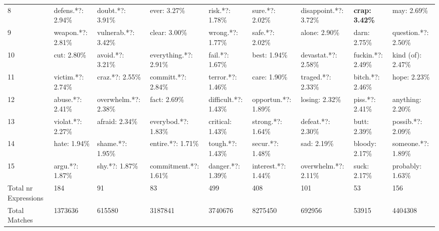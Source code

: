\begin{table}[h]
\begin{adjustbox}{width=\linewidth, center}
\begin{tabular}{lllllllll}
	8                    &           defens.*?: 2.94\% &      doubt.*?: 3.91\% &           ever: 3.27\% &       risk.*?: 1.78\% &      sure.*?: 2.02\% &  disappoint.*?: 3.72\% &      \textbf{crap: 3.42\%} &           may: 2.69\% \\
	9                    &           weapon.*?: 2.81\% &   vulnerab.*?: 3.42\% &          clear: 3.00\% &      wrong.*?: 1.77\% &      safe.*?: 2.02\% &          alone: 2.90\% &               darn: 2.75\% &   question.*?: 2.50\% \\
	10                   &                 cut: 2.80\% &      avoid.*?: 3.21\% &  everything.*?: 2.91\% &       fail.*?: 1.67\% &         best: 1.94\% &    devastat.*?: 2.58\% &          fuckin.*?: 2.49\% &     kind (of): 2.47\% \\
	11                   &           victim.*?: 2.74\% &       craz.*?: 2.55\% &     committ.*?: 2.84\% &     terror.*?: 1.46\% &         care: 1.90\% &      traged.*?: 2.33\% &           bitch.*?: 2.46\% &          hope: 2.23\% \\
	12                   &            abuse.*?: 2.41\% &  overwhelm.*?: 2.38\% &           fact: 2.69\% &  difficult.*?: 1.43\% &  opportun.*?: 1.89\% &         losing: 2.32\% &            piss.*?: 2.41\% &      anything: 2.20\% \\
	13                   &           violat.*?: 2.27\% &        afraid: 2.34\% &    everybod.*?: 1.83\% &      critical: 1.43\% &    strong.*?: 1.64\% &      defeat.*?: 2.30\% &               butt: 2.39\% &     possib.*?: 2.09\% \\
	14                   &                hate: 1.94\% &      shame.*?: 1.95\% &      entire.*?: 1.71\% &      tough.*?: 1.43\% &     secur.*?: 1.48\% &            sad: 2.19\% &             bloody: 2.17\% &    someone.*?: 1.89\% \\
	15                   &             argu.*?: 1.87\% &        shy.*?: 1.87\% &  commitment.*?: 1.61\% &     danger.*?: 1.39\% &  interest.*?: 1.44\% &   overwhelm.*?: 2.11\% &               suck: 2.17\% &      probably: 1.63\% \\
	Total nr Expressions &                         184 &                    91 &                     83 &                   499 &                  408 &                    101 &                         53 &                   156 \\
	Total Matches        &                     1373636 &                615580 &                3187841 &               3740676 &              8275450 &                 692956 &                      53915 &               4404308 \\
	\bottomrule
	\end{tabular}
	
\end{adjustbox}
	\end{table}


